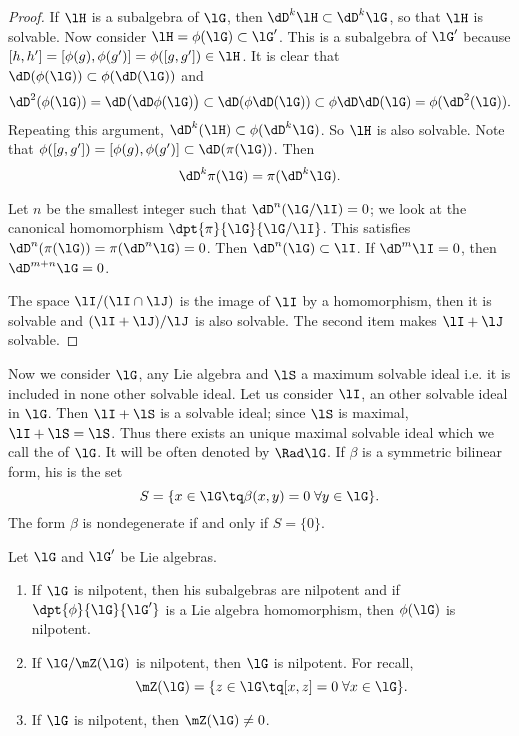 \begin{proof}
If $\lH$ is a subalgebra of $\lG$, then $\dD^k\lH\subset\dD^k\lG$, so that $\lH$ is solvable. Now consider $\lH=\phi(\lG)\subset\lG'$. This is a subalgebra of $\lG'$ because $[h,h']=[\phi(g),\phi(g')]=\phi([g,g'])\in\lH$. It is clear that $\dD(\phi(\lG))\subset\phi(\dD(\lG))$ and
\begin{equation}
\dD^2(\phi(\lG))=\dD\big( \dD\phi(\lG) \big)
                \subset\dD(\phi\dD(\lG))  
        \subset\phi\dD\dD(\lG) 
        =\phi(\dD^2(\lG)).
\end{equation}
Repeating this argument, $\dD^k(\lH)\subset\phi(\dD^k\lG)$. So $\lH$ is also solvable. Note that $\phi([g,g'])=[\phi(g),\phi(g')]\subset\dD(\pi(\lG))$. Then 
\begin{equation}
  \dD^k\pi(\lG)=\pi(\dD^k\lG).
\end{equation}

Let $n$ be the smallest integer such that $\dD^n(\lG/\lI)=0$; we look at the canonical homomorphism $\dpt{\pi}{\lG}{\lG/\lI}$. This satisfies $\dD^n(\pi(\lG))=\pi(\dD^n\lG)=0$. Then $\dD^n(\lG)\subset\lI$. If $\dD^m\lI=0$, then $\dD^{m+n}\lG=0$.

The space $\lI/(\lI\cap\lJ)$ is the image of $\lI$ by a homomorphism, then it is solvable and $(\lI+\lJ)/\lJ$ is also solvable. The second item makes $\lI+\lJ$ solvable.
\end{proof}

Now we consider $\lG$, any Lie algebra and $\lS$ a maximum solvable ideal i.e. it is included in none other solvable ideal. Let us consider $\lI$, an other solvable ideal in $\lG$. Then $\lI+\lS$ is a solvable ideal; since $\lS$ is maximal, $\lI+\lS=\lS$. Thus there exists an unique maximal solvable ideal which we call the  of $\lG$. It will be often denoted by $\Rad\lG$. If $\beta$ is a symmetric bilinear form, his  is the set
\begin{equation}
  S=\{x\in\lG\tq\beta(x,y)=0\;\forall y\in\lG\}.
\end{equation}
The form $\beta$ is nondegenerate if and only if $S=\{0\}$. 

\begin{proposition}
Let $\lG$ and $\lG'$ be Lie algebras. 

\begin{enumerate}
\item If $\lG$ is nilpotent, then his subalgebras are nilpotent and if $\dpt{\phi}{\lG}{\lG'}$ is a Lie algebra homomorphism, then $\phi(\lG)$ is nilpotent.

\item If $\lG/\mZ(\lG)$ is nilpotent, then $\lG$ is nilpotent. For recall,
\[
   \mZ(\lG)=\{z\in\lG\tq [x,z]=0\;\forall x\in\lG\}.
\]

\item If $\lG$ is nilpotent, then $\mZ(\lG)\neq 0$.
\end{enumerate}
\label{prop:nil_homom_nil}
\end{proposition}

